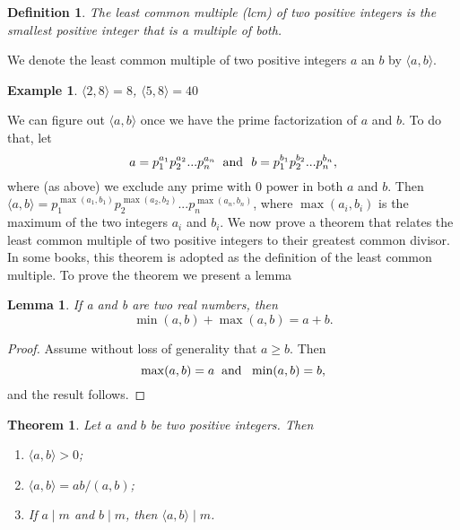 \documentclass[12pt,letterpaper]{book}
\newtheorem{definition}{Definition}
\newtheorem{theorem}{Theorem}
\newtheorem{lemma}{Lemma}
\newtheorem{example}{Example}
\begin{document}
\begin{definition}\label{lcm}
The least common multiple (lcm) of two positive integers is the
smallest positive integer that is a multiple of both.
\end{definition}

We denote the least common multiple of two positive integers $a$ an
$b$ by $\langle a,b\rangle$.

\begin{example}
$\langle2,8\rangle=8$, $\langle5,8\rangle=40$
\end{example}

We can figure out $\langle a,b\rangle$ once we have the prime
factorization of $a$ and $b$.  To do that, let
\begin{equation*}
a=p_1^{a_1}p_2^{a_2}...p_n^{a_n}  \hspace{0.2cm}\mbox{and}\ \
b=p_1^{b_1}p_2^{b_2}...p_n^{b_n},
\end{equation*}
where (as above) we exclude any prime with 0 power in both $a$ and $b$. Then $\langle
a,b\rangle=p_1^{\max(a_1,b_1)}p_2^{\max(a_2,b_2)}...p_n^{\max(a_n,b_n)}$,
where $\max(a_i,b_i)$ is the maximum of the two integers $a_i$ and $b_i$. We
now prove a theorem that relates the least common multiple of two
positive integers to their greatest common divisor.  In some books,
this theorem is adopted as the definition of the least common
multiple.  To prove the theorem we present a lemma

\begin{lemma}
If a and b are two real numbers, then
\begin{equation*}
\min(a,b)+\max(a,b)=a+b.
\end{equation*}
\end{lemma}

\begin{proof}
Assume without loss of generality that $a\geq b$.  Then
\begin{equation*}
\max(a,b)=a \hspace{0.2cm}\mbox{and} \ \  \min(a,b)=b,
\end{equation*}
and the result follows.
\end{proof}

\newpage

\begin{theorem}
Let $a$ and $b$ be two positive integers.  Then
\begin{enumerate}
 \item {$\langle a,b\rangle> 0$};
 \item {$\langle a,b \rangle=ab/(a,b)$};
\item{If $a\mid m$ and $b \mid m$, then $\langle a,b \rangle \mid
m$}.
\end{enumerate}
\end{theorem}
\end{document}
